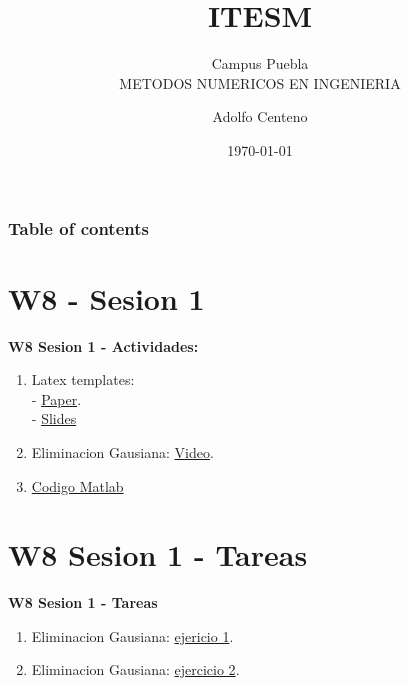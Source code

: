 \documentclass{beamer}
\begin{document}
\title{ITESM}  
\subtitle{Campus Puebla\\METODOS NUMERICOS EN INGENIERIA
}
\author{Adolfo Centeno}
\date{\today} 


\begin{frame}
\titlepage
\end{frame}

\begin{frame}\frametitle{Table of contents}
\tableofcontents
\end{frame} 


\section{W8 - Sesion 1 }

\begin{frame}

\textbf{W8 Sesion 1 - Actividades:}

\begin{enumerate}
\item
    Latex templates:  \\
    - \href{https://miktex.org/download}{Paper}. \\
    - \href{https://dzone.com/articles/installing-latex-ubuntu}{Slides} 
\item
	Eliminacion Gausiana: \href{https://www.youtube.com/watch?v=XRcx8-2lLJI}{Video}.	
\item
	\href{https://github.com/adsoftsito/tdd/blob/master/w3/helloworld.tex}{Codigo Matlab} 

	

\end{enumerate} 

\end{frame}


\section{W8 Sesion 1 - Tareas }

\begin{frame}


\textbf{W8 Sesion 1 - Tareas}


\begin{enumerate}
\item
	Eliminacion Gausiana: \href{https://www.youtube.com/watch?v=SxT5Sbn8odE}{ejericio 1}.	
\item
	Eliminacion Gausiana: \href{https://www.youtube.com/watch?v=SxT5Sbn8odE}{ejercicio 2}.	

\end{enumerate} 


\end{frame}
\end{document}
